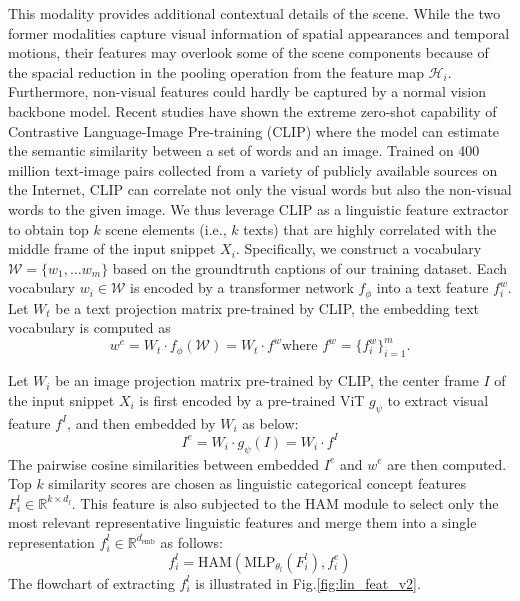 \documentclass[letterpaper]{article} \usepackage{aaai23}  \usepackage{times}  \usepackage{helvet}  \usepackage{courier}  \usepackage[hyphens]{url}  \usepackage{graphicx} \urlstyle{rm} \def\UrlFont{\rm}  \usepackage{natbib}  \usepackage{caption} \frenchspacing  \setlength{\pdfpagewidth}{8.5in}  \setlength{\pdfpageheight}{11in}  \usepackage{algorithm}
\begin{document}
This modality provides additional contextual details of the scene. 
While the two former modalities capture visual information of spatial appearances and temporal motions, their features may overlook some of the scene components because of the spacial reduction in the pooling operation from the feature map $\mathcal{H}_i$. Furthermore, non-visual features could hardly be captured by a normal vision backbone model. 
Recent studies \cite{Patashnik2021styleclip, Yang2021} have shown the extreme zero-shot capability of Contrastive Language-Image Pre-training (CLIP) where the model can estimate the semantic similarity between a set of words and an image. 
Trained on 400 million text-image pairs collected from a variety of publicly available sources on the Internet, CLIP can correlate not only the visual words but also the non-visual words to the given image.
We thus leverage CLIP as a linguistic feature extractor to obtain top $k$ scene elements (i.e., $k$ texts) that are highly correlated with the middle frame of the input snippet $X_i$. 
Specifically, we construct a vocabulary $\mathcal{W} = \{w_1, \dots w_m\}$ based on the groundtruth captions of our training dataset. Each vocabulary $w_i\in \mathcal{W}$ is encoded by a transformer network $f_\phi$ into a text feature $f_i^w$. Let $W_t$ be a text projection matrix pre-trained by CLIP, the embedding text vocabulary is computed as 
\begin{equation}
    w^e = W_t \cdot f_\phi(\mathcal{W}) = W_t \cdot f^w
    \text{where }
    f^w = \{f_i^w\}_{i=1}^{m}.
\end{equation} 
 
Let $W_i$ be an image projection matrix pre-trained by CLIP, the center frame $I$ of the input snippet $X_i$ is first encoded by a pre-trained ViT $g_\psi$ to extract visual feature $f^I$, and then embedded by $W_i$ as below:
\begin{equation}
    I^e = W_i\cdot g_\psi(I) = W_i\cdot f^I
\end{equation}
The pairwise cosine similarities between embedded $I^e$ and $w^e$ are then computed. Top $k$ similarity scores are chosen as linguistic categorical concept features $F_i^l\in \mathbb{R}^{k\times d_l}$. This feature is also subjected to the HAM module to select only the most relevant representative linguistic features and merge them into a single representation $f_i^{l} \in\mathbb{R}^{d_\text{emb}}$ as follows:
\begin{equation}
    f_i^{l} = \text{HAM}(\text{MLP}_{\theta_l}(F_i^l), f_i^e)
\end{equation}
The flowchart of extracting $f_i^{l}$ is illustrated in Fig.\ref{fig:lin_feat_v2}.
\end{document}
